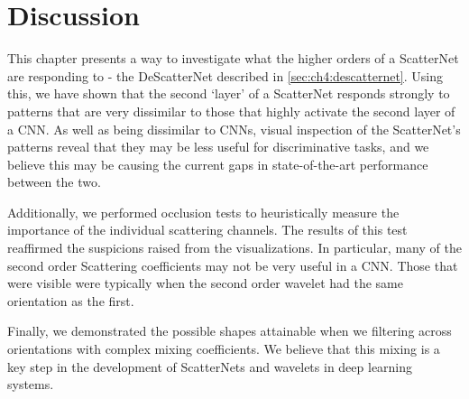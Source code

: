 \section{Discussion}
This chapter presents a way to investigate what the higher orders of a ScatterNet
are responding to - the DeScatterNet described in \autoref{sec:ch4:descatternet}.
Using this, we have shown that the second `layer' of a ScatterNet 
responds strongly to patterns that are very dissimilar to those that highly activate the
second layer of a CNN\@. As well as being dissimilar to CNNs, visual inspection of the
ScatterNet's patterns reveal that they may be less useful for discriminative
tasks, and we believe this may be causing the current gaps in state-of-the-art
performance between the two. 

Additionally, we performed occlusion tests to heuristically measure the
importance of the individual scattering channels. The results of this test
reaffirmed the suspicions raised from the visualizations. In particular, many of
the second order Scattering coefficients may not be very useful in a CNN. Those
that were visible were typically when the second order wavelet had the same
orientation as the first.

Finally, we demonstrated the possible shapes attainable when we filtering 
across orientations with complex mixing coefficients. We believe that this 
mixing is a key step in the development of ScatterNets and wavelets in deep
learning systems.

